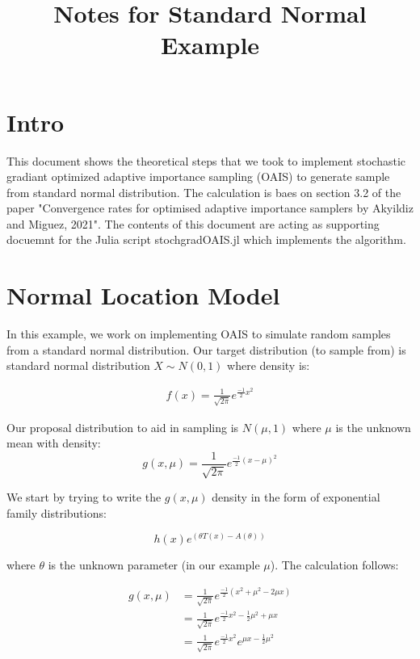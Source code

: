 \documentclass{article}
\title{Notes for Standard Normal Example}
\begin{document}
\maketitle

\section{Intro}
This document shows the theoretical steps that we took to implement stochastic gradiant optimized adaptive importance sampling (OAIS) to generate sample from standard normal distribution. The calculation is baes on section 3.2 of the paper "Convergence rates for optimised adaptive importance samplers by Akyildiz and Miguez, 2021". The contents of this document are acting as supporting docuemnt for the Julia script stochgradOAIS.jl which implements the algorithm.

\section{Normal Location Model}
In this example, we work on implementing OAIS to simulate random samples from a standard normal
distribution. Our target distribution (to sample from) is standard normal distribution $X \sim N(0,1)$ where density is:

\begin{align*}
f(x) = \frac{1}{\sqrt{2\pi}} e^{\frac{-1}{2} x^2}    
\end{align*}

Our proposal distribution to aid in sampling is $N(\mu,1)$ where $\mu$ is the unknown mean with density:
$$
g(x,\mu) = \frac{1}{\sqrt{2\pi}} e^{\frac{-1}{2} (x-\mu)^2}
$$

We start by trying to write the $g(x,\mu)$ density in the form of exponential family distributions:

$$h(x) e^{(\theta T(x) - A(\theta))}$$

where $\theta$ is the unknown parameter (in our example $\mu$). The calculation follows:

\begin{align*}
    g(x,\mu) &= \frac{1}{\sqrt{2\pi}} e^{ \frac{-1}{2} (x^2 + \mu^2 - 2 \mu x) } \\
             &= \frac{1}{\sqrt{2\pi}} e^{ \frac{-1}{2} x^2 - \frac{1}{2} \mu^2 + \mu x } \\
             &= \frac{1}{\sqrt{2\pi}} e^{\frac{-1}{2}x^2} e^{\mu x - \frac{1}{2} \mu^2}
\end{align*}
\end{document}
